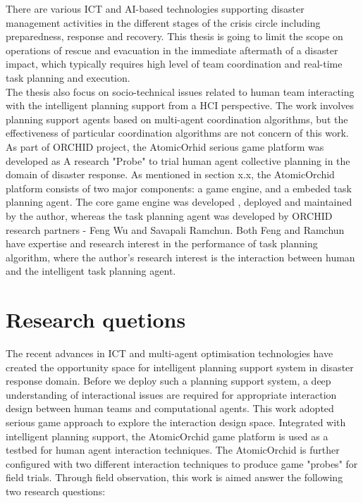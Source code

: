 There are various ICT and AI-based technologies supporting disaster management activities in the different stages of the crisis circle including preparedness, response and recovery. This thesis is going to limit the scope on operations of rescue and evacuation in the immediate aftermath of a disaster impact, which typically requires high level of team coordination and real-time task planning and execution.\\ 

The thesis also focus on socio-technical issues related to human team interacting with the intelligent planning support from a HCI perspective. The work involves planning support agents based on multi-agent coordination algorithms, but the effectiveness of particular coordination algorithms are not concern of this work.\\

As part of ORCHID project, the AtomicOrhid serious game platform was developed as A research "Probe" to trial human agent collective planning in the domain of disaster response. As mentioned in section x.x,  the AtomicOrchid platform consists of two major components: a game engine, and a embeded task planning agent. The core game engine was developed , deployed and maintained by the author, whereas the task planning agent was developed by ORCHID research partners - Feng Wu and Savapali Ramchun. Both Feng and Ramchun have expertise and research interest in the performance of task planning algorithm, where the author's research interest is the interaction between human and the intelligent task planning agent. 

\section{Research quetions}
The recent advances in ICT and multi-agent optimisation technologies have created the opportunity space for intelligent planning support system in disaster response domain. Before we deploy such a planning support system, a deep understanding of interactional issues are required for appropriate interaction design between human teams and computational agents. This work adopted serious game approach to explore the interaction design space. Integrated with intelligent planning support, the AtomicOrchid game platform is used as a testbed for human agent interaction techniques.  The AtomicOrchid is further configured with two different interaction techniques to produce game "probes" for field trials. Through field observation, this work is aimed answer the following two research questions:

